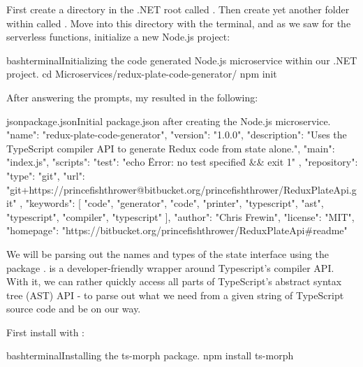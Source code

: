 \documentclass[paper=6in:9in,pagesize=pdftex,headinclude=on,footinclude=on,12pt,twoside]{scrbook}
\begin{document}

First create a directory in the .NET root called . Then create yet another folder within  called . Move into this directory with the terminal, and as we saw for the serverless functions, initialize a new Node.js project:

\begin{codeInput}{bash}{terminal}{Initializing the code generated Node.js microservice within our .NET project.}
cd Microservices/redux-plate-code-generator/
npm init
\end{codeInput}

After answering the prompts, my  resulted in the following:

\begin{codeInput}{json}{package.json}{Initial package.json after creating the Node.js microservice.}
{
  "name": "redux-plate-code-generator",
  "version": "1.0.0",
  "description": "Uses the TypeScript compiler API to generate Redux code from state alone.",
  "main": "index.js",
  "scripts": {
    "test": "echo \"Error: no test specified\" && exit 1"
  },
  "repository": {
    "type": "git",
    "url": "git+https://princefishthrower@bitbucket.org/princefishthrower/ReduxPlateApi.git"
  },
  "keywords": [
    "code",
    "generator",
    "code",
    "printer",
    "typescript",
    "ast",
    "typescript",
    "compiler",
    "typescript"
  ],
  "author": "Chris Frewin",
  "license": "MIT",
  "homepage": "https://bitbucket.org/princefishthrower/ReduxPlateApi#readme"
}
\end{codeInput}


We will be parsing out the names and types of the state interface using the package .  is a developer-friendly wrapper around Typescript's compiler API. With it, we can rather quickly access all parts of TypeScript's abstract syntax tree (AST) API - to parse out what we need from a given string of TypeScript source code and be on our way.

First install  with :

\begin{codeInput}{bash}{terminal}{Installing the ts-morph package.}
npm install ts-morph
\end{codeInput}
\end{document}
